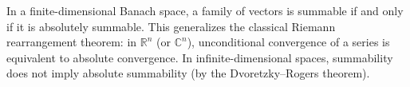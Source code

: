 In a finite-dimensional Banach space, a family of vectors is summable if and only if it is absolutely summable. This generalizes the classical Riemann rearrangement theorem: in $\mathbb{R}^n$ (or $\mathbb{C}^n$), unconditional convergence of a series is equivalent to absolute convergence. In infinite-dimensional spaces, summability does not imply absolute summability (by the Dvoretzky--Rogers theorem).
